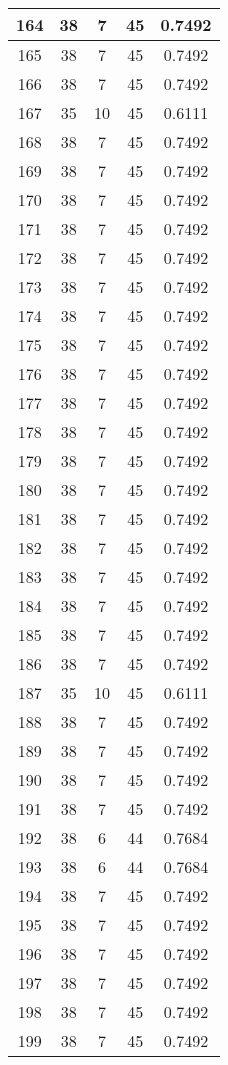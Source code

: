 \documentclass[letterpaper, 12pt]{article}
\begin{document}
\begin{longtable}{|c|c|c|c|c|}
\hline
164 & 38 & 7 & 45 & 0.7492 \\
\hline
165 & 38 & 7 & 45 & 0.7492 \\
\hline
166 & 38 & 7 & 45 & 0.7492 \\
\hline
167 & 35 & 10 & 45 & 0.6111 \\
\hline
168 & 38 & 7 & 45 & 0.7492 \\
\hline
169 & 38 & 7 & 45 & 0.7492 \\
\hline
170 & 38 & 7 & 45 & 0.7492 \\
\hline
171 & 38 & 7 & 45 & 0.7492 \\
\hline
172 & 38 & 7 & 45 & 0.7492 \\
\hline
173 & 38 & 7 & 45 & 0.7492 \\
\hline
174 & 38 & 7 & 45 & 0.7492 \\
\hline
175 & 38 & 7 & 45 & 0.7492 \\
\hline
176 & 38 & 7 & 45 & 0.7492 \\
\hline
177 & 38 & 7 & 45 & 0.7492 \\
\hline
178 & 38 & 7 & 45 & 0.7492 \\
\hline
179 & 38 & 7 & 45 & 0.7492 \\
\hline
180 & 38 & 7 & 45 & 0.7492 \\
\hline
181 & 38 & 7 & 45 & 0.7492 \\
\hline
182 & 38 & 7 & 45 & 0.7492 \\
\hline
183 & 38 & 7 & 45 & 0.7492 \\
\hline
184 & 38 & 7 & 45 & 0.7492 \\
\hline
185 & 38 & 7 & 45 & 0.7492 \\
\hline
186 & 38 & 7 & 45 & 0.7492 \\
\hline
187 & 35 & 10 & 45 & 0.6111 \\
\hline
188 & 38 & 7 & 45 & 0.7492 \\
\hline
189 & 38 & 7 & 45 & 0.7492 \\
\hline
190 & 38 & 7 & 45 & 0.7492 \\
\hline
191 & 38 & 7 & 45 & 0.7492 \\
\hline
192 & 38 & 6 & 44 & 0.7684 \\
\hline
193 & 38 & 6 & 44 & 0.7684 \\
\hline
194 & 38 & 7 & 45 & 0.7492 \\
\hline
195 & 38 & 7 & 45 & 0.7492 \\
\hline
196 & 38 & 7 & 45 & 0.7492 \\
\hline
197 & 38 & 7 & 45 & 0.7492 \\
\hline
198 & 38 & 7 & 45 & 0.7492 \\
\hline
199 & 38 & 7 & 45 & 0.7492 \\
\hline
\end{longtable}
\end{document}
